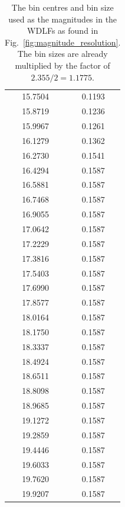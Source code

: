 \documentclass[fleqn,usenatbib]{mnras}
\begin{document}
\begin{table}
\begin{tabular}{c|c}
        15.7504 & 0.1193\\
        15.8719 & 0.1236\\
        15.9967 & 0.1261\\
        16.1279 & 0.1362\\
        16.2730 & 0.1541\\
        16.4294 & 0.1587\\
        16.5881 & 0.1587\\
        16.7468 & 0.1587\\\hline
        16.9055 & 0.1587\\
        17.0642 & 0.1587\\
        17.2229 & 0.1587\\
        17.3816 & 0.1587\\
        17.5403 & 0.1587\\
        17.6990 & 0.1587\\
        17.8577 & 0.1587\\
        18.0164 & 0.1587\\
        18.1750 & 0.1587\\
        18.3337 & 0.1587\\\hline
        18.4924 & 0.1587\\
        18.6511 & 0.1587\\
        18.8098 & 0.1587\\
        18.9685 & 0.1587\\
        19.1272 & 0.1587\\
        19.2859 & 0.1587\\
        19.4446 & 0.1587\\
        19.6033 & 0.1587\\
        19.7620 & 0.1587\\
        19.9207 & 0.1587\\\hline
            \end{tabular}
    \caption{The bin centres and bin size used as the magnitudes in the WDLFs as found in Fig.~\ref{fig:magnitude_resolution}. The bin sizes are already multiplied by the factor of $2.355 /2 = 1.1775$.}
    \label{tab:magnitude_resolution}
\end{table}
\end{document}
